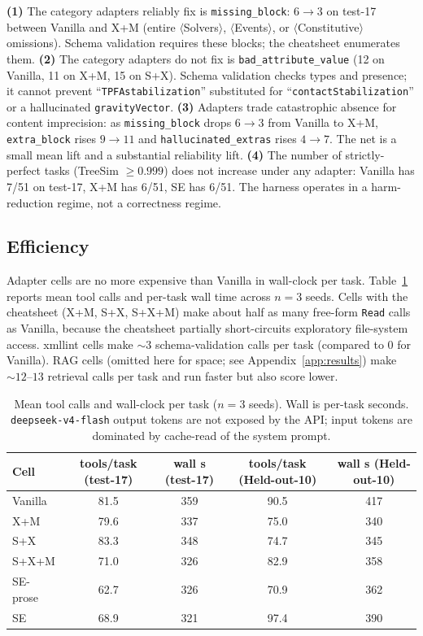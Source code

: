 \documentclass{article}
\begin{document}
\textbf{(1)} The category adapters reliably fix is \texttt{missing\_block}: $6{\to}3$ on test-17 between Vanilla and X+M (entire $\langle$Solvers$\rangle$, $\langle$Events$\rangle$, or $\langle$Constitutive$\rangle$ omissions). Schema validation requires these blocks; the cheatsheet enumerates them.
\textbf{(2)} The category adapters do not fix is \texttt{bad\_attribute\_value} (12 on Vanilla, 11 on X+M, 15 on S+X). Schema validation checks types and presence; it cannot prevent ``\texttt{TPFAstabilization}'' substituted for ``\texttt{contactStabilization}'' or a hallucinated \texttt{gravityVector}.
\textbf{(3)} Adapters trade catastrophic absence for content imprecision: as \texttt{missing\_block} drops $6{\to}3$ from Vanilla to X+M, \texttt{extra\_block} rises $9{\to}11$ and \texttt{hallucinated\_extras} rises $4{\to}7$. The net is a small mean lift and a substantial reliability lift.
\textbf{(4)} The number of strictly-perfect tasks (TreeSim $\geq 0.999$) does not increase under any adapter: Vanilla has 7/51 on test-17, X+M has 6/51, SE has 6/51. The harness operates in a harm-reduction regime, not a correctness regime.

\subsection{Efficiency}
\label{subsec:efficiency}

Adapter cells are no more expensive than Vanilla in wall-clock per task. Table~\ref{tab:efficiency} reports mean tool calls and per-task wall time across $n=3$ seeds. Cells with the cheatsheet (X+M, S+X, S+X+M) make about half as many free-form \texttt{Read} calls as Vanilla, because the cheatsheet partially short-circuits exploratory file-system access. xmllint cells make ${\sim}3$ schema-validation calls per task (compared to 0 for Vanilla). RAG cells (omitted here for space; see Appendix~\ref{app:results}) make ${\sim}12$--$13$ retrieval calls per task and run faster but also score lower.

\begin{table}[h]
  \caption{Mean tool calls and wall-clock per task ($n=3$ seeds). Wall is per-task seconds. \texttt{deepseek-v4-flash} output tokens are not exposed by the API; input tokens are dominated by cache-read of the system prompt.}
  \label{tab:efficiency}
  \centering
  \small
  \begin{tabular}{lcccc}
    \toprule
    \textbf{Cell} & \textbf{tools/task (test-17)} & \textbf{wall s (test-17)} & \textbf{tools/task (Held-out-10)} & \textbf{wall s (Held-out-10)} \\
    \midrule
    Vanilla  & 81.5 & 359 & 90.5 & 417 \\
    X+M  & 79.6 & 337 & 75.0 & 340 \\
    S+X  & 83.3 & 348 & 74.7 & 345 \\
    S+X+M  & 71.0 & 326 & 82.9 & 358 \\
    SE-prose & 62.7 & 326 & 70.9 & 362 \\
    SE  & 68.9 & 321 & 97.4 & 390 \\
    \bottomrule
  \end{tabular}
\end{table}
\end{document}

